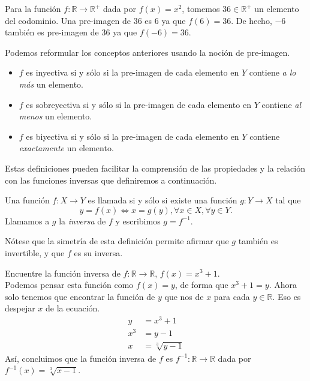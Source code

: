 \documentclass[12pt]{book}
\begin{document}
\begin{exampleenv}
    Para la función $f:\mathbb{R}\to\mathbb{R^+}$ dada por $f(x)=x^2$, tomemos $36\in \mathbb{R}^+$ un elemento del codominio. Una pre-imagen de $36$ es $6$ ya que $f(6)=36$. De hecho, $-6$ también es pre-imagen de $36$ ya que $f(-6)=36$.
\end{exampleenv}

Podemos reformular los conceptos anteriores usando la noción de pre-imagen.

\begin{itemize}
    \item $f$ es inyectiva si y sólo si la pre-imagen de cada elemento en $Y$ contiene \textit{a lo más} un elemento.
    \item $f$ es sobreyectiva si y sólo si la pre-imagen de cada elemento en $Y$ contiene \textit{al menos} un elemento.
    \item $f$ es biyectiva si y sólo si la pre-imagen de cada elemento en $Y$ contiene \textit{exactamente} un elemento.
\end{itemize}

Estas definiciones pueden facilitar la comprensión de las propiedades y la relación con las funciones inversas que definiremos a continuación.

\begin{definitionenv}
     Una función $f:X\rightarrow Y$ es llamada  si y sólo si existe una función $g:Y\rightarrow X$ tal que
    \[
        y=f(x)\iff x=g(y), \forall x\in X, \forall y\in Y.
    \]
    Llamamos a $g$ la \textit{inversa} de $f$ y escribimos $g=f^{-1}$.
\end{definitionenv}

Nótese que la simetría de esta definición permite afirmar que $g$ también es invertible, y que $f$ es su inversa.

\begin{exampleenv}
    Encuentre la función inversa de $f:\mathbb{R}\to \mathbb{R}$, $f(x)=x^3+1$.\\
    Podemos pensar esta función como $f(x)=y$, de forma que $x^3+1=y$. Ahora solo tenemos que encontrar la función de $y$ que nos de $x$ para cada $y\in \mathbb{R}$. Eso es despejar $x$ de la ecuación.
    \begin{align*}
        y &= x^3+1\\
        x^3&=y-1\\
        x&=\sqrt[3]{y-1}
    \end{align*}
    Así, concluimos que la función inversa de $f$ es $f^{-1}:\mathbb{R}\to\mathbb{R}$ dada por $f^{-1}(x)=\sqrt[3]{x-1}.$
\end{exampleenv}
\end{document}
